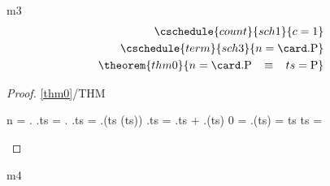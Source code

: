 \documentclass{article}
\begin{document}
\begin{machine}{m3}
\begin{align}
		\cschedule{count}{sch1}{c = 1} \\
		\cschedule{term}{sch3}{n = \card.\Pcs} \\
		\theorem{thm0}{n = \card.\Pcs \3\equiv ts = \Pcs}
	\end{align}
	
	\begin{proof}{\ref{thm0}/THM}
	\begin{calculation}	
		n = \card.\Pcs
	\hint{=}{ \eqref{m3:inv1} }
		\card.ts = \card.\Pcs
	\hint{=}{ }
		\card.ts = \card.(ts \bunion (\Pcs \setminus ts))
	\hint{=}{ }
		\card.ts = \card.ts + \card.(\Pcs \setminus ts)
	\hint{=}{ }
		0 = \card.(\Pcs \setminus ts)
	\hint{=}{ }
		\emptyset = \Pcs \setminus ts
	\hint{=}{ }
		ts = \Pcs
	\end{calculation}
	\end{proof}
\end{machine}

\begin{machine}{m4}
\end{machine}
\end{document}
